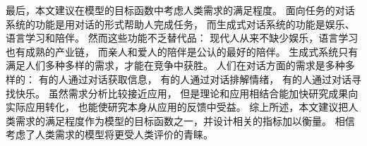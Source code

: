 最后，本文建议在模型的目标函数中考虑人类需求的满足程度。
面向任务的对话系统的功能是用对话的形式帮助人完成任务，
而生成式对话系统的功能是娱乐、语言学习和陪伴。
然而这些功能不乏替代品：
现代人从来不缺少娱乐，语言学习也有成熟的产业链，
而亲人和爱人的陪伴是公认的最好的陪伴。
生成式系统只有满足人们多种多样的需求，才能在竞争中获胜。
人们在对话方面的需求是多种多样的：
有的人通过对话获取信息，
有的人通过对话排解情绪，
有的人通过对话寻找快乐。
虽然需求分析比较接近应用，
但是理论和应用相结合能加快研究成果向实际应用转化，
也能使研究本身从应用的反馈中受益。
综上所述，本文建议把人类需求的满足程度作为模型的目标函数之一，并设计相关的指标加以衡量。
相信考虑了人类需求的模型将更受人类评价的青睐。
